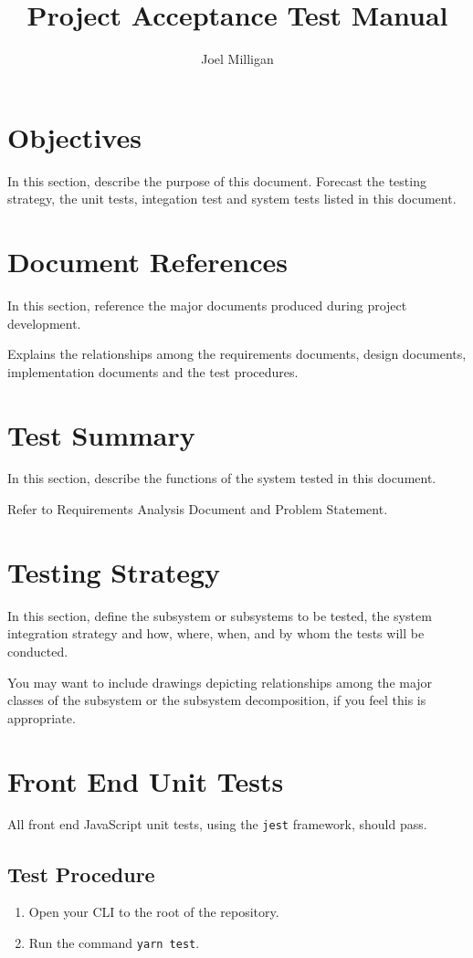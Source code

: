 \documentclass[a4paper, draft]{article}
\author{Joel Milligan}
\title{Project Acceptance Test Manual}
\date{}
\begin{document}
\maketitle
\tableofcontents

\newpage
\section{Objectives}
In this section, describe the purpose of this document.
Forecast the testing strategy, the unit tests, integation test and system tests listed in this document.

\section{Document References}
In this section, reference the major documents produced during project development.

Explains the relationships among the requirements documents, design documents, implementation documents and the test procedures.

\section{Test Summary}
In this section, describe the functions of the system tested in this document.

Refer to Requirements Analysis Document and Problem Statement.

\section{Testing Strategy}
In this section, define the subsystem or subsystems to be tested, the system integration strategy and how, where, when, and by whom the tests will be conducted.

You may want to include drawings depicting relationships among the major classes of the subsystem or the subsystem decomposition, if you feel this is appropriate.

\newpage
\section{Front End Unit Tests}
All front end JavaScript unit tests, using the \texttt{jest} framework, should pass.

\subsection{Test Procedure}
\begin{enumerate}
    \item Open your CLI to the root of the repository.
    \item Run the command \texttt{yarn test}.
\end{enumerate}
\end{document}
